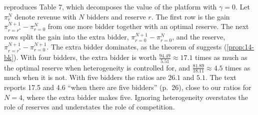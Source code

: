  reproduces Table 7, which decomposes the value of the platform with
$\gamma=0$. Let $\pi^N_{r}$ denote revenue with $N$ bidders and reserve $r$. The first row is the gain
$\pi^{N+1}_{r=r^*}-\pi^N_{r=0}$ from one more bidder together with an optimal reserve. The next rows split
the gain into the extra bidder, $\pi^{N+1}_{r=0}-\pi^N_{r=0}$, and the reserve,
$\pi^{N+1}_{r=r^*}-\pi^{N+1}_{r=0}$. The extra bidder dominates, as the theorem of
\citet{BulowKlemperer1996} suggests (\cref{prop:14-bk}). With four bidders, the extra bidder is
worth $\frac{94.49}{5.51}\approx17.1$ times as much as the optimal reserve when heterogeneity is
controlled for, and $\frac{81.89}{18.11}\approx4.5$ times as much when it is not. With five bidders the ratios are $26.1$ and $5.1$.
The text reports 17.5 and 4.6 ``when there are five bidders'' (p.~26), close to our ratios for $N=4$, where
the extra bidder makes five.
Ignoring heterogeneity overstates the role of reserves and understates the role of competition.

